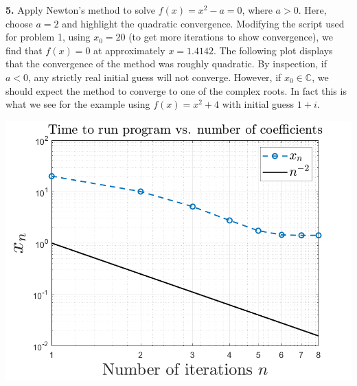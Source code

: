 \documentclass{article}
\begin{document}
    \textbf{5.} Apply Newton's method to solve $f(x) = x^2 - a = 0$, where $a > 0$. Here, choose $a = 2$ and highlight the quadratic convergence.
    \newline\newline
    Modifying the script used for problem 1, using $x_0 = 20$ (to get more iterations to show convergence), we find that $f(x) = 0$ at approximately $x = 1.4142$. The following plot displays that the convergence of the method was roughly quadratic. By inspection, if $a < 0$, any strictly real initial guess will not converge. However, if $x_0 \in \mathbb{C}$, we should expect the method to converge to one of the complex roots. In fact this is what we see for the example using $f(x) = x^2 + 4$ with initial guess $1 + i$.
    \begin{center}
        \includegraphics[scale = 0.5]{2_7_5_plot.png}
    \end{center}
\end{document}
